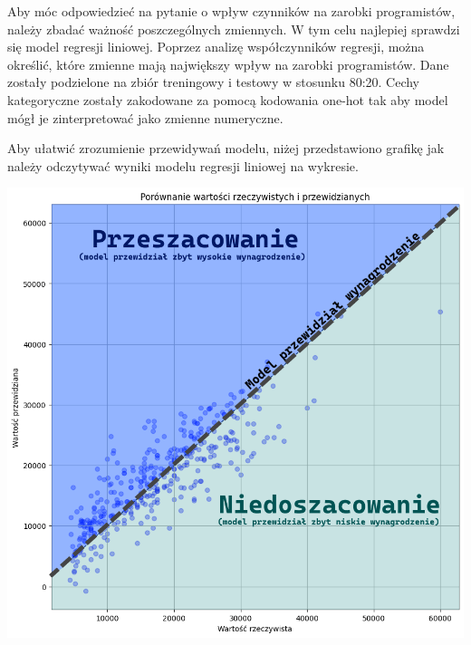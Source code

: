 \documentclass{article}
\begin{document}
Aby móc odpowiedzieć na pytanie o wpływ czynników na zarobki programistów, należy zbadać ważność poszczególnych zmiennych.
W tym celu najlepiej sprawdzi się model regresji liniowej. Poprzez analizę współczynników regresji, można określić, które zmienne mają największy wpływ na zarobki programistów.
Dane zostały podzielone na zbiór treningowy i testowy w stosunku 80:20.
Cechy kategoryczne zostały zakodowane za pomocą kodowania one-hot tak aby model mógł je zinterpretować jako zmienne numeryczne.

Aby ułatwić zrozumienie przewidywań modelu, niżej przedstawiono grafikę jak należy odczytywać wyniki modelu regresji liniowej na wykresie.

\begin{center}
    \includegraphics[scale=0.5]{img/czytanie_wykres.png}
\end{center}
\end{document}
